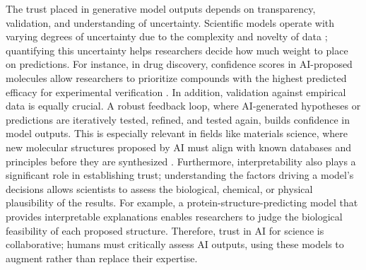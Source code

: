 The trust placed in generative model outputs depends on transparency, validation, and understanding of uncertainty. Scientific models operate with varying degrees of uncertainty due to the complexity and novelty of data \cite{schwaller2021prediction,raghavan2023dataset,choudhary2022recent,schleder2019dft,chen2025unveiling,guo2024can,huang2024application,liang2024scemqa,chen2024scholarchemqa}; quantifying this uncertainty helps researchers decide how much weight to place on predictions. For instance, in drug discovery, confidence scores in AI-proposed molecules allow researchers to prioritize compounds with the highest predicted efficacy for experimental verification \cite{nigam2021assigning,borkakoti2023alphafold2,zeng2022deep,le2024molx}. In addition, validation against empirical data is equally crucial. A robust feedback loop, where AI-generated hypotheses or predictions are iteratively tested, refined, and tested again, builds confidence in model outputs. This is especially relevant in fields like materials science, where new molecular structures proposed by AI must align with known databases and principles before they are synthesized \cite{shu20203d,bickel2023design,zeni2023mattergen}. Furthermore, interpretability \cite{medina2024interpretable,gangwal2024unlocking} also plays a significant role in establishing trust; understanding the factors driving a model’s decisions allows scientists to assess the biological, chemical, or physical plausibility of the results. For example, a protein-structure-predicting model that provides interpretable explanations enables researchers to judge the biological feasibility of each proposed structure. Therefore, trust in AI for science is collaborative; humans must critically assess AI outputs, using these models to augment rather than replace their expertise.

